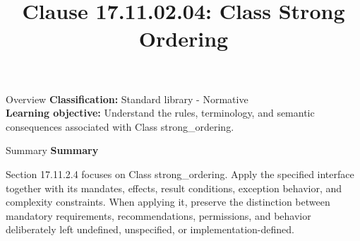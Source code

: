 \documentclass[10pt,letterpaper]{article}
\title{Clause 17.11.02.04: Class Strong Ordering}
\author{}
\date{}
\begin{document}
\maketitle
\begin{CornellOverviewBox}{Overview}
\textbf{Classification:} Standard library - Normative\\[2pt]
\textbf{Learning objective:} Understand the rules, terminology, and semantic consequences associated with Class strong\_ordering.
\end{CornellOverviewBox}\begin{CornellSummaryBox}{Summary}
{\sffamily\bfseries\color{Accent} Summary}\par\vspace{3pt}Section 17.11.2.4 focuses on Class strong\_ordering. Apply the specified interface together with its mandates, effects, result conditions, exception behavior, and complexity constraints. When applying it, preserve the distinction between mandatory requirements, recommendations, permissions, and behavior deliberately left undefined, unspecified, or implementation-defined.
\end{CornellSummaryBox}
\end{document}
